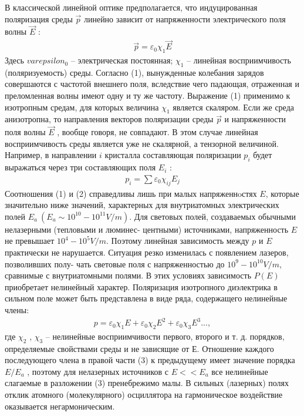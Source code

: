 \documentclass[twocolumn]{article}
\begin{document}
В классической линейной оптике предполагается, что индуцированная
поляризация среды $\vec{p}$ линейно зависит от напряженности
электрического поля волны $\vec{E}$ :\begin{align}
\vec{p} = \varepsilon_0 \chi_1 \vec{E}
\end{align}Здесь $varepsilon_0$ -- электрическая постоянная; $\chi_1$ -- линейная
восприимчивость (поляризуемость) среды. Согласно (1), вынужденные
колебания зарядов совершаются с частотой внешнего поля, вследствие чего
падающая, отраженная и преломленная волны имеют одну и ту же частоту.
Выражение (1) применимо к изотропным средам, для которых величина
$\chi_1$ является скаляром. Если же среда анизотропна, то направления
векторов поляризации среды $\vec{p}$ и напряженности поля волны
$\vec{E}$ , вообще говоря, не совпадают. В этом случае линейная
восприимчивость среды является уже не скалярной, а тензорной величиной.
Например, в направлении $i$ кристалла составляющая поляризации $p_i$
будет выражаться через три составляющих поля $E_i$ :\begin{align}
p_i = \sum \varepsilon_0 \chi_{ij}E_{j}
\end{align}Соотношения (1) и (2) справедливы лишь при малых напряженнoстях $E$,
которые значительно ниже значений, характерных для внутриатомных
электрических полей $E_a\  (E_a \sim 10^{10} - 10^{11} V/m)$. Для световых
полей, создаваемых обычными нелазерными (тепловыми и люминес- центными)
источниками, напряженность ${E}$ не превышает $10^4-10^5 V/m$. Поэтому
линейная зависимость между ${p}$ и ${E}$ практически не нарушается.
Ситуация резко изменилась с появлением лазеров, позволивших полу- чать
световые поля с напряженностью до $10^9 - 10^{10} V/m$, сравнимые с
внутриатомными полями. В этих условиях зависимость $P( E )$ приобретает
нелинейный характер. Поляризация изотропного диэлектрика в сильном поле
может быть представлена в виде ряда, содержащего нелинейные члены:\begin{align}
p = \varepsilon_0\chi_1E+\varepsilon_0\chi_2E^2+\varepsilon_0\chi_3E^3...,
\end{align}где $\chi_2$ , $\chi_3$ -- нелинейные восприимчивости первого, второго и т. д.
порядков, определяемые свойствами среды и не зависящие от $ Е $. Отношение каждого последующего члена в правой части (3) к предыдущему имеет
значение порядка $E/E_a$ , поэтому для нелазерных источников с
$E << E_a$ все нелинейные слагаемые в разложении (3) пренебрежимо
малы. В сильных (лазерных) полях отклик атомного (молекулярного)
осциллятора на гармоническое воздействие оказывается негармоническим.
\end{document}

